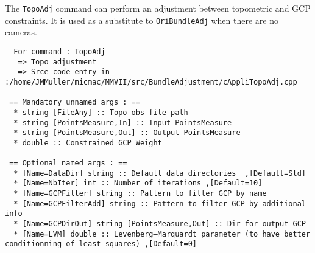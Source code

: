 The {\tt TopoAdj} command can perform an adjustment between topometric and GCP constraints.
It is used as a substitute to {\tt OriBundleAdj} when there are no cameras.

\begin{verbatim}
  For command : TopoAdj 
   => Topo adjustment
   => Srce code entry in :/home/JMMuller/micmac/MMVII/src/BundleAdjustment/cAppliTopoAdj.cpp

 == Mandatory unnamed args : ==
  * string [FileAny] :: Topo obs file path
  * string [PointsMeasure,In] :: Input PointsMeasure
  * string [PointsMeasure,Out] :: Output PointsMeasure
  * double :: Constrained GCP Weight

 == Optional named args : ==
  * [Name=DataDir] string :: Defautl data directories  ,[Default=Std]
  * [Name=NbIter] int :: Number of iterations ,[Default=10]
  * [Name=GCPFilter] string :: Pattern to filter GCP by name
  * [Name=GCPFilterAdd] string :: Pattern to filter GCP by additional info
  * [Name=GCPDirOut] string [PointsMeasure,Out] :: Dir for output GCP
  * [Name=LVM] double :: Levenberg–Marquardt parameter (to have better conditionning of least squares) ,[Default=0]
\end{verbatim}

